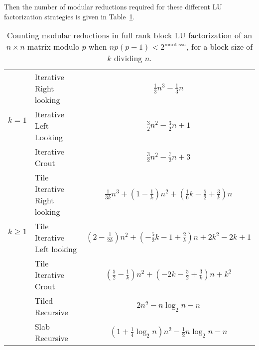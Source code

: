 \documentclass{article}
\begin{document}
Then the number of modular reductions required for these different LU
factorization strategies is given in Table~\ref{tab:modcount}.
\begin{table}[ht]
\renewcommand{\arraystretch}{1.5}
\center 
\begin{tabular}{clc}
\toprule
\multirow{3}{*}{\begin{sideways}$k= 1$\end{sideways}} 
& Iterative Right looking & $\frac{1}{3}n^3-\frac{1}{3}n$ \\
& Iterative Left Looking & $\frac{3}{2}n^2-\frac{3}{2}n+1$\\
& Iterative Crout & $\frac{3}{2}n^2-\frac{7}{2}n+3$\\
\midrule
\multirow{3}{*}{\begin{sideways}$k\geq 1$\end{sideways}} 
& Tile Iterative Right looking & $\frac{1}{3k}n^3+\left(1-\frac{1}{k}\right)n^2+\left(\frac{1}{6}k-\frac{5}{2}+\frac{3}{k}\right)n$ \\
& Tile Iterative Left looking & $\left(2-\frac{1}{2k}\right)n^2+\left(-\frac{5}{2}k-1+\frac{2}{k}\right)n+2k^2-2k+1$\\
& Tile Iterative Crout & $\left(\frac{5}{2}-\frac{1}{k}\right)n^2+\left(-2k-\frac{5}{2}+\frac{3}{k}\right)n+k^2$\\
\midrule
& Tiled Recursive & $2n^2-n\log_2 n-n$\\
\midrule
& Slab Recursive & $(1+\frac{1}{4}\log_2 n)n^2-\frac{1}{2}n\log_2 n-n$\\
\bottomrule
\end{tabular}
\vspace{5pt}
\caption{Counting modular reductions in full rank block LU
  factorization of an $n\times n$ matrix modulo $p$ when $np(p-1)<2^\text{mantissa}$,
  for a block size of $k$ dividing $n$.}\label{tab:modcount}
\vspace{-10pt}
\end{table}
 
 
 
 
 
\end{document}
